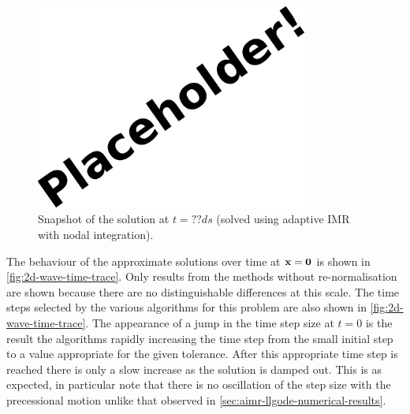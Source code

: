 \begin{figure}
  \centering
  \includegraphics[width=0.8\textwidth]{images/placeholder}
  \caption{Snapshot of the solution at $t=??ds$ (solved using adaptive IMR with nodal integration).}
  \label{fig:2d-wave-snapshot}
\end{figure}

The behaviour of the approximate solutions over time at $\boldsymbol{\mathrm{x}}= \mathbf{0}$ is shown in \cref{fig:2d-wave-time-trace}.
Only results from the methods without re-normalisation are shown because there are no distinguishable differences at this scale.
The time steps selected by the various algorithms for this problem are also shown in \cref{fig:2d-wave-time-trace}.
The appearance of a jump in the time step size at $t=0$ is the result the algorithms rapidly increasing the time step from the small initial step to a value appropriate for the given tolerance.
After this appropriate time step is reached there is only a slow increase as the solution is damped out.
This is as expected, in particular note that there is no oscillation of the step size with the precessional motion unlike that observed in \cref{sec:aimr-llgode-numerical-results}.

